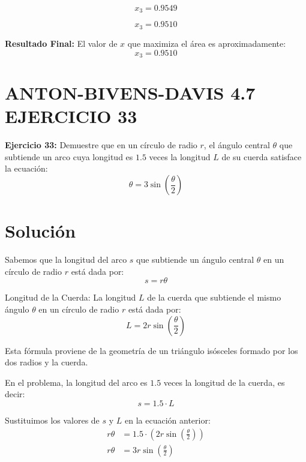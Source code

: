    \begin{equation}
       x_3 = 0.9549
    \end{equation}

    \begin{equation}
       x_3 = 0.9510
    \end{equation}


\textbf{Resultado Final:} El valor de \( x \) que maximiza el área es aproximadamente:
   \begin{equation}
       x_3 = 0.9510
   \end{equation}

\section*{ANTON-BIVENS-DAVIS 4.7 EJERCICIO 33}

\textbf{Ejercicio 33:} Demuestre que en un círculo de radio \( r \), el ángulo central \( \theta \) que
subtiende un arco cuya longitud es \( 1.5 \) veces la longitud \( L \) de
su cuerda satisface la ecuación:
\[
\theta = 3 \sin\left(\frac{\theta}{2}\right)
\]



\section*{Solución}

Sabemos que la longitud del arco \( s \) que subtiende un ángulo central \( \theta \) en un círculo de radio \( r \) está dada por:
   \begin{equation}
       s = r \theta
   \end{equation}

 Longitud de la Cuerda: La longitud \( L \) de la cuerda que subtiende el mismo ángulo \( \theta \) en un círculo de radio \( r \) está dada por:
   \begin{equation}
       L = 2r \sin\left(\frac{\theta}{2}\right)
   \end{equation}

   Esta fórmula proviene de la geometría de un triángulo isósceles formado por los dos radios y la cuerda.

En el problema, la longitud del arco es \( 1.5 \) veces la longitud de la cuerda, es decir:
   \begin{equation}
       s = 1.5 \cdot L
   \end{equation}

Sustituimos los valores de \( s \) y \( L \) en la ecuación anterior:
   \begin{align}
       r \theta &= 1.5 \cdot \left( 2r \sin\left(\frac{\theta}{2}\right) \right) \\
       r \theta &= 3r \sin\left(\frac{\theta}{2}\right)
   \end{align}

